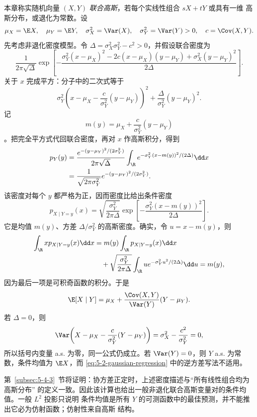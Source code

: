 \begin{example}[联合高斯分布的条件均值]\label{ex:5-2-3-1}
本章称实随机向量 $(X,Y)$ \emph{联合高斯}，若每个实线性组合 $sX+tY$ 或具有一维
高斯分布，或退化为常数。设
\[
 \mu_X=\E X,\quad \mu_Y=\E Y,\quad
 \sigma_X^2=\Var(X),\quad\sigma_Y^2=\Var(Y)>0,
 \quad c=\Cov(X,Y).
\]
先考虑非退化密度模型。令 $\Delta=\sigma_X^2\sigma_Y^2-c^2>0$，并假设联合密度为
\[
 \frac1{2\pi\sqrt\Delta}
 \exp\!\left[-\frac{
 \sigma_Y^2(x-\mu_X)^2-2c(x-\mu_X)(y-\mu_Y)
 +\sigma_X^2(y-\mu_Y)^2}{2\Delta}\right].
\]
关于 $x$ 完成平方：分子中的二次式等于
\[
 \sigma_Y^2\left(x-\mu_X-\frac{c}{\sigma_Y^2}(y-\mu_Y)\right)^2
 +\frac{\Delta}{\sigma_Y^2}(y-\mu_Y)^2.
\]
记
\[
 m(y)=\mu_X+\frac{c}{\sigma_Y^2}(y-\mu_Y)
\]
。把完全平方式代回联合密度，再对 $x$ 作高斯积分，得到
\begin{align*}
 p_Y(y)
 &=\frac{e^{-(y-\mu_Y)^2/(2\sigma_Y^2)}}{2\pi\sqrt\Delta}
   \int_\R
   e^{-\sigma_Y^2(x-m(y))^2/(2\Delta)}\dd x\\
 &=\frac1{\sqrt{2\pi\sigma_Y^2}}
   e^{-(y-\mu_Y)^2/(2\sigma_Y^2)}.
\end{align*}
该密度对每个 $y$ 都严格为正，因而密度比给出条件密度
\[
 p_{X\mid Y=y}(x)
 =\sqrt{\frac{\sigma_Y^2}{2\pi\Delta}}
  \exp\!\left[-\frac{\sigma_Y^2(x-m(y))^2}{2\Delta}\right].
\]
它是均值 $m(y)$、方差 $\Delta/\sigma_Y^2$ 的高斯密度。确实，令
$u=x-m(y)$，则
\begin{align*}
 \int_\R x p_{X\mid Y=y}(x)\dd x
 &=m(y)\int_\R p_{X\mid Y=y}(x)\dd x\\
 &\quad+
 \sqrt{\frac{\sigma_Y^2}{2\pi\Delta}}
 \int_\R u e^{-\sigma_Y^2u^2/(2\Delta)}\dd u
 =m(y),
\end{align*}
因为最后一项是可积奇函数的积分。于是
\begin{equation}\label{eq:5-2-gaussian-regression}
 \E[X\mid Y]
 =\mu_X+\frac{\Cov(X,Y)}{\Var(Y)}(Y-\mu_Y).
\end{equation}
若 $\Delta=0$，则
\[
 \Var\!\left(X-\mu_X-\frac{c}{\sigma_Y^2}(Y-\mu_Y)\right)
 =\sigma_X^2-\frac{c^2}{\sigma_Y^2}=0,
\]
所以括号内变量 a.s. 为零，同一公式仍成立。若 $\Var(Y)=0$，则 $Y$ a.s. 为常数，条件均值为
$\E X$，而 \eqref{eq:5-2-gaussian-regression} 中的逆方差写法不适用。

第~\ref{subsec:5-4-3}~节将证明：协方差正定时，上述密度描述与“所有线性组合均为高斯分布”
的定义一致。因此该计算也给出一般非退化联合高斯变量对的条件均值。一般 $L^2$ 投影只说明
条件均值是所有 $Y$ 的可测函数中的最佳预测，并不能推出它必为仿射函数；仿射性来自高斯
结构。
\end{example}

